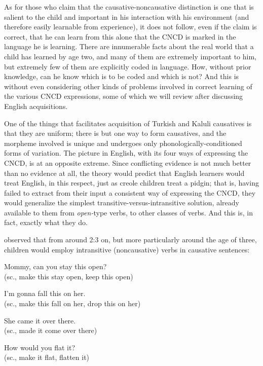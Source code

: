As for those who claim that the causative-noncausative distinc\-tion is one that is salient to the child and important in his interaction with his environment (and therefore easily learnable from experience), it does not follow, even if the claim is correct, that he can learn from this alone that the CNCD is marked in the language he is learning. There are innumerable facts about the real world that a child has learned by age two, and many of them are extremely important to him, but extremely few of them are explicitly coded in language. How, without prior knowledge, can he know which is to be coded and which is not? And this is without even considering other kinds of problems involved in correct learning of the various CNCD expressions, some of which we will review after discussing English acquisitions.

One of the things that facilitates acquisition of Turkish and Kaluli causatives is that they are uniform; there is but one way to form causatives, and the morpheme involved is unique and undergoes only phonologically-conditioned forms of variation. The picture in English, with its four ways of expressing the CNCD, is at an opposite extreme. Since conflicting evidence is not much better than no evidence at all, the theory would predict that English learners would treat English, in this respect, just as creole children treat a pidgin; that is, having failed to extract from their input a consistent way of expressing the CNCD, they would generalize the simplest transitive-versus-intransitive solution, already available to them from \textit{open-}type verbs, to other classes of verbs. And this is, in fact, exactly what they do.


\citet{Bowerman1974} observed that from around 2:3 on, but more particularly around the age of three, children would employ intransitive (noncausative) verbs in causative sentences:

\ea\label{ex:3:77}
Mommy, can you stay this open?\\
\glt (sc., make this stay open, keep this open)
\z

\ea\label{ex:3:78}
I'm gonna fall this on her.\\
\glt (sc., make this fall on her, drop this on her) 
\z

\ea\label{ex:3:79}
She came it over there.\\
\glt (sc., made it come over there)
\z

\ea\label{ex:3:80}
How would you flat it?\\
\glt (sc., make it flat, flatten it)
\z

